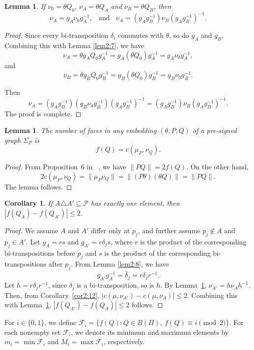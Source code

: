 \documentclass[12pt]{article}
\newtheorem{corollary}[theorem]{Corollary}
\newtheorem{lemma}[theorem]{Lemma}
\theoremstyle{definition}
\begin{document}
\begin{lemma}\label{lem2:13}
If $\nu_0=\theta Q_0$, $\nu_A=\theta Q_A$ and $\nu_B=\theta Q_B$, then
$$\nu_A=g_A\nu_0g_A^{-1},~~~~\mbox{and}~~~~\nu_A=(g_Ag_B^{-1})\nu_B(g_Ag_B^{-1})^{-1}.$$
\end{lemma}
\begin{proof}
Since every bi-transposition $\delta_i$ commutes with $\theta$, so do $g_A$ and $g_B$. Combining this with Lemma \ref{lem2:7}, we have
$$\nu_A=\theta g_AQ_0g_A^{-1} =g_A(\theta Q_0)g_A^{-1} =g_A\nu_0g_A^{-1},$$and
$$\nu_B=\theta g_BQ_0g_B^{-1} =g_B(\theta Q_0)g_B^{-1} =g_B\nu_0g_B^{-1}.$$

Then $$\nu_A=(g_Ag_B^{-1})(g_B\nu_0g_B^{-1})(g_Ag_B^{-1})^{-1} =(g_Ag_B^{-1})\nu_B(g_Ag_B^{-1})^{-1}.$$
The proof is complete.
\end{proof}


\begin{lemma}\label{lem2:14} The number of faces in any embedding $(\theta,P,Q)$ of a pre-signed graph $\Sigma_P$ is $$f(Q)=c(\mu_P,\nu_Q).$$
\end{lemma}
\begin{proof}
From Proposition~6 in ~\cite{Chen2026PreSigned}, we have
$\lVert PQ\rVert=2f(Q).$ On the other hand, $$2c(\mu_P,\nu_Q)=\lVert\mu_P\nu_Q\rVert= \lVert(P\theta)(\theta Q)\rVert=\lVert PQ\rVert.$$ The lemma follows.
\end{proof}

 \begin{corollary}
\label{cor2:15}
If $A\triangle A'\subseteq\mathcal P$ has exactly one element, then
$|f(Q_A)-f(Q_{A'})|\leq 2$.
\end{corollary}

\begin{proof}
We assume $A$ and $A'$ differ only at $p_j$, and further assume $p_j\notin A$ and $p_j\in A'$.
Let $g_A=rs$ and $g_{A'}=r\delta_j s$, where $r$ is the product of the corresponding bi-transpositions
before $p_j$ and $s$ is the product of the corresponding bi-transpositions after
$p_j$. From Lemma \ref{lem2:8}, we have
$$g_{A'}g_A^{-1}=\widehat\delta_j=r\delta_jr^{-1}.$$
Let $h=r\delta_jr^{-1}$, since $\delta_j$ is a bi-transposition, so is
$h$. By Lemma~\ref{lem2:13},
$\nu_{A'}=h\nu_Ah^{-1}$. Then, from
Corollary~\ref{cor2:12},
$\bigl|c(\mu,\nu_{A'})-c(\mu,\nu_A)\bigr|\leq2$.
Combining this with Lemma~\ref{lem2:14},
$|f(Q_{A'})-f(Q_A)|\leq2$ follows.
\end{proof}

For $i\in\{0,1\}$, we define
$\mathcal F_i = \{f(Q):Q\in B(\Pi),\ f(Q)\equiv i\pmod 2\}.$
For each nonempty set $\mathcal F_i$, we denote its minimum and maximum elements by
$m_i=\min\mathcal F_i$ and $M_i=\max\mathcal F_i$, respectively.
\end{document}
